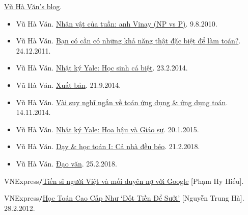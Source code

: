 \documentclass{article}
\numberwithin{equation}{section}
\begin{document}
\begin{thebibliography}{99}
	 \href{https://vuhavan.wordpress.com/}{Vũ Hà Văn's blog}.
	\begin{itemize}
		\item Vũ Hà Văn. \href{https://vuhavan.wordpress.com/2010/08/09/nhan-v%e1%ba%adt-c%e1%bb%a7a-tu%e1%ba%a7n-anh-vinay-np-vs-p/}{Nhân vật của tuần: anh Vinay (NP vs P)}. 9.8.2010.
		\item Vũ Hà Văn. \href{https://vuhavan.wordpress.com/2011/12/24/b%e1%ba%a1n-co-c%e1%ba%a7n-co-nh%e1%bb%afng-kh%e1%ba%a3-nang-th%e1%ba%adt-d%e1%ba%b7c-bi%e1%bb%87t-d%e1%bb%83-lam-toan/}{Bạn có cần có những khả năng thật đặc biệt để làm toán?}. 24.12.2011.
		\item Vũ Hà Văn. \href{https://vuhavan.wordpress.com/2014/02/23/nhat-ky-yale-hoc-sinh-ca-biet/}{Nhật ký Yale: Học sinh cá biệt}. 23.2.2014.
		\item Vũ Hà Văn. \href{https://vuhavan.wordpress.com/2014/09/21/xuat-ban/}{Xuất bản}. 21.9.2014.
		\item Vũ Hà Văn. \href{https://vuhavan.wordpress.com/2014/01/14/vai-suy-nghi-ngan-ve-toan-ung-dung-va-ung-dung-toan/}{Vài suy nghĩ ngắn về toán ứng dụng \& ứng dụng toán}. 14.11.2014.
		\item Vũ Hà Văn. \href{https://vuhavan.wordpress.com/2015/01/20/nhat-ky-yale-hoa-hau-va-giao-su/}{Nhật ký Yale: Hoa hậu và Giáo sư}. 20.1.2015.
		\item Vũ Hà Văn. \href{https://vuhavan.wordpress.com/2018/02/21/ca-nha-deu-beo/}{Dạy \& học toán I: Cả nhà đều béo}. 21.2.2018.
		\item Vũ Hà Văn. \href{https://vuhavan.wordpress.com/2018/02/25/dao-van/}{Đạo văn}. 25.2.2018.
	\end{itemize}
	
	 VNExpress\texttt{/}\href{https://vnexpress.net/tien-si-nguoi-viet-va-moi-duyen-no-voi-google-4430615.html}{Tiến sĩ người Việt và mối duyên nợ với Google} [Phạm Hy Hiếu].
	
	 VNExpress\texttt{/}\href{https://vnexpress.net/hoc-toan-cao-cap-nhu-dot-tien-de-suoi-2223794.html}{Học Toán Cao Cấp Như `Đốt Tiền Để Sưởi'} [Nguyễn Trung Hà]. 28.2.2012.
\end{thebibliography}

\printbibliography[heading=bibintoc]
\end{document}
